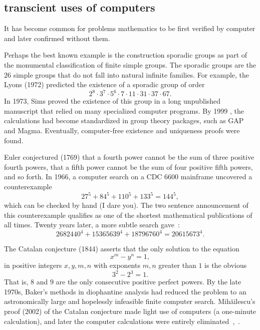 \documentclass{llncs}
\begin{document}
\subsection{transcient uses of computers}

It has become common for problems mathematics to be first verified by
computer and later confirmed without them.

Perhaps the best known example is the construction sporadic groups as
part of the monumental classification of finite simple groups.  The
sporadic groups are the $26$ simple groups that do not fall into
natural infinite families.  For example, the Lyons (1972) predicted
the existence of a sporadic group of order
\[
2^ 8\cdot 3^7\cdot 5^6\cdot  7\cdot 11 \cdot 31 \cdot 37 \cdot 67.
\]
In 1973, Sims proved the existence of this group in a long unpublished
manuscript that relied on many specialized computer programs.
By 1999 \cite{HS99}, the calculations had become standardized in group theory
packages, such as GAP and Magma.
Eventually,  computer-free existence \cite{MParker} and uniqueness \cite{AS92} proofs were found.





Euler conjectured (1769) that a fourth power cannot
be the sum of three positive fourth powers, that a fifth power cannot be the sum of four positive fifth powers, and so forth.  
In 1966, a computer search \cite{LP66} on a CDC 6600 mainframe uncovered a counterexample 
\[
27^5 + 84^5 + 110^5 + 133^5 = 144^5,
\]
which can be checked by hand (I dare you). 
The two sentence announcement of this counterexample qualifies as one of the shortest mathematical publications of all times.
Twenty years later, a more subtle search
gave~\cite{Elkies88}:
\[
2682440^4 + 15365639^4 + 18796760^4 = 20615673^4.
\]


The Catalan conjecture (1844) asserts that the only solution to the equation
\[
x^m - y^n = 1,
\]
in positive integers $x,y,m,n$ with exponents $m,n$ greater than $1$
is the obvious
\[
3^2 - 2^3 = 1.
\]
That is, $8$ and $9$ are the only consecutive positive perfect powers.
By the late 1970s, Baker's methods in diophantine analysis had reduced
the problem to an astronomically large and hopelessly infeasible finite
computer search.  Mih\u ailescu's proof (2002) of the Catalan
conjecture made light use of computers (a one-minute calculation), and
later the computer calculations were entirely eliminated~\cite{Mih},~\cite{TM03}.
\end{document}
